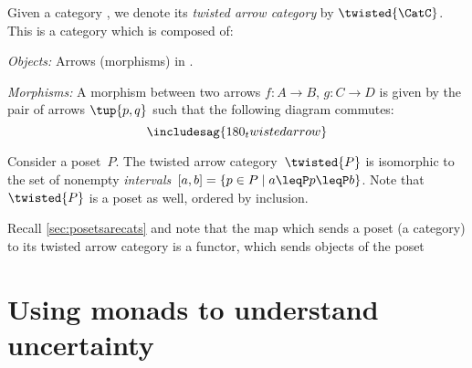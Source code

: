 




\begin{ctdefinition}
    Given a category \CatC, we denote its \emph{twisted arrow category} by $\twisted{\CatC}$. This is a category which is composed of:
    \begin{compactenum}
        \item \emph{Objects:} Arrows (morphisms) in \CatC.
        \item \emph{Morphisms:} A morphism between two arrows $f\colon A\to B$, $g\colon C\to D$ is given by the pair of arrows $\tup{p,q}$ such that the following diagram commutes:
        \begin{equation}
            \includesag{180_twistedarrow}
        \end{equation}
    \end{compactenum}
\end{ctdefinition}

\begin{example}[Intervals]
    Consider a poset~$P$. The twisted arrow category~$\twisted{P}$ is isomorphic to the set of nonempty \emph{intervals}~$[a,b]=\{p \in P\mid a\leqP p \leqP b\}$. Note that~$\twisted{P}$ is a poset as well, ordered by inclusion.
\end{example}
\begin{remark}
    Recall \cref{sec:posetsarecats} and note that the map which sends a poset (a category) to its twisted arrow category is a functor, which sends objects of the poset
\end{remark}




\section{Using monads to understand uncertainty}

